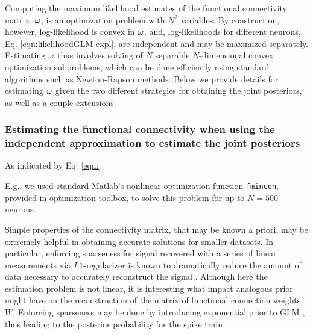 
Computing the maximum likelihood estimates of the functional connectivity matrix, $\mathbf{\omega}$, is an optimization problem with $N^2$ variables. By construction, however, log-likelihood is convex in $\mathbf{\omega}$, and, log-likelihoods for different neurons, Eq. \eqref{eqn:likelihoodGLM-expl}, are independent and may be maximized separately. Estimating $\mathbf{\omega}$ thus involves solving of $N$ separable $N$-dimensional convex optimization subproblems, which can be done efficiently using standard algorithms such as Newton-Rapson methods. Below we provide details for estimating $\mathbf{\omega}$ given the two different strategies for obtaining the joint posteriors, as well as a couple extensions.

\subsubsection{Estimating the functional connectivity when using the independent approximation to estimate the joint posteriors}

As indicated by Eq. \eqref{eqn:}


E.g., we used standard Matlab's nonlinear optimization function \texttt{fmincon}, provided in optimization toolbox, to solve this problem for up to $N=500$ neurons.

Simple properties of the connectivity matrix, that may be known a priori, may be extremely helpful in obtaining accurate solutions for smaller datasets. In particular, enforcing sparseness for signal recovered with a series of linear measurements via $L1$-regularizer is known to dramatically reduce the amount of data necessary to accurately reconstruct the signal \cite{Candes2005, DE03, Mishchenko2009}. Although here the estimation problem is not linear, it is interesting what impact analogous prior might have on the reconstruction of the matrix of functional connection weights $W$. Enforcing sparseness may be done by introducing exponential prior to GLM \cite{Stevenson2009}, thus leading to the posterior probability for the spike train

